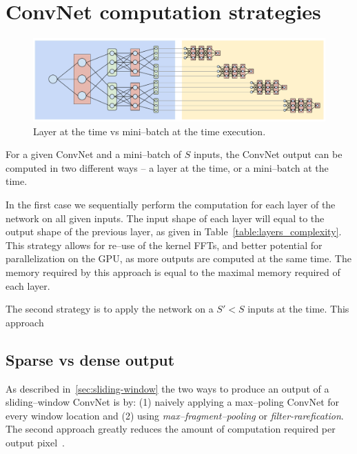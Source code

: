 \documentclass[conference]{IEEEtran}
\begin{document}
\section{ConvNet computation strategies}

  \begin{figure}
    \centering
    \includegraphics[width=0.99\columnwidth]{fig/layer_vs_batch.pdf}
    \caption{Layer at the time vs mini--batch at the time execution.}
    \label{fig:executions}
  \end{figure}

  For a given ConvNet and a mini--batch of $S$ inputs, the ConvNet
  output can be computed in two different ways -- a layer at the time,
  or a mini--batch at the time.

  In the first case we sequentially perform the computation for each
  layer of the network on all given inputs.  The input shape of each
  layer will equal to the output shape of the previous layer, as given
  in Table~\ref{table:layers_complexity}.  This strategy allows for
  re--use of the kernel FFTs, and better potential for parallelization
  on the GPU, as more outputs are computed at the same time.  The
  memory required by this approach is equal to the maximal memory
  required of each layer.

  The second strategy is to apply the network on a $S' < S$ inputs at
  the time.  This approach

\subsection{Sparse vs dense output}

  As described in~\ref{sec:sliding-window} the two ways to produce an
  output of a sliding--window ConvNet is by: (1) naively applying a
  max--poling ConvNet for every window location and (2) using
  \emph{max--fragment--pooling} or \emph{filter-rarefication}.
  The second approach greatly reduces the amount of computation
  required per output pixel~\cite{giusti2013fast,masci2013fast,
    zlateski2015znn,long2015fully,sermanet2013overfeat,yu2015multi}.
\end{document}
